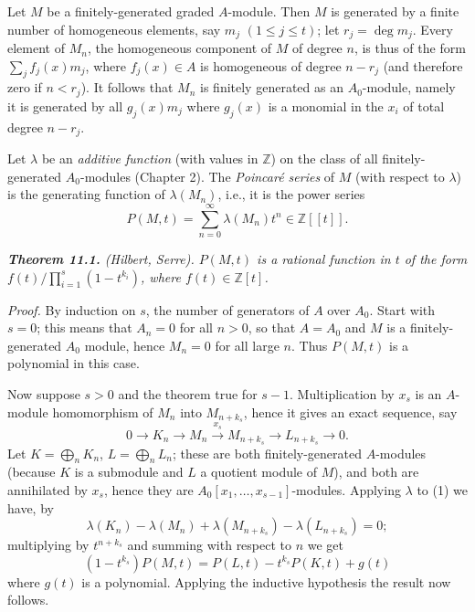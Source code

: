 Let $M$ be a finitely-generated graded $A$-module.  Then $M$ is generated by a
finite number of homogeneous elements, say $m_j$ $(1\leq j\leq t)$; let $r_j=\deg m_j$.
Every element of $M_n$, the homogeneous component of $M$ of degree $n$, is thus of
the form $\sum_j f_j(x)m_j$, where $f_j(x)\in A$ is homogeneous of degree $n-r_j$ (and
therefore zero if $n<r_j$).  It follows that $M_n$ is finitely generated as an $A_0$-module, namely it is generated by all $g_j(x)m_j$ where $g_j(x)$ is a monomial in the
$x_i$ of total degree $n-r_j$.

Let $\lambda$ be an \emph{additive function} (with values in $\mathbb Z$) on the class of all finitely-generated $A_0$-modules (Chapter 2).  The \emph{Poincar\'e series} of $M$ (with respect to $\lambda$)
is the generating function of $\lambda(M_n)$, i.e., it is the power series
\[
P(M,t)=\sum_{n=0}^\infty\lambda(M_n)t^n\in\mathbb Z[[t]].
\]

\medskip
\noindent\textit{\textbf{Theorem 11.1.} (Hilbert, Serre). $P(M,t)$ is a rational function in $t$ of the form
$f(t)/\prod_{i=1}^s(1-t^{k_i})$, where $f(t)\in\mathbb Z[t]$.}

\noindent\emph{Proof.}  By induction on $s$, the number of generators of $A$ over $A_0$.  Start with
$s=0$; this means that $A_n=0$ for all $n>0$, so that $A=A_0$ and $M$ is a finitely-generated $A_0$ module, hence $M_n=0$ for all large $n$.  Thus $P(M,t)$ is a polynomial
in this case.

Now suppose $s>0$ and the theorem true for $s-1$.  Multiplication by $x_s$
is an $A$-module homomorphism of $M_n$ into $M_{n+k_s}$, hence it gives an exact
sequence, say
\begin{equation}
0\longrightarrow K_n\longrightarrow M_n\xrightarrow{x_s}M_{n+k_s}\longrightarrow L_{n+k_s}\longrightarrow0.
\tag{1}
\end{equation}
Let $K=\bigoplus_nK_n$, $L=\bigoplus_nL_n$; these are both finitely-generated $A$-modules
(because $K$ is a submodule and $L$ a quotient module of $M$), and both are annihilated by $x_s$, hence they are $A_0[x_1,\ldots,x_{s-1}]$-modules.  Applying $\lambda$ to (1) we
have, by 
\[
\lambda(K_n)-\lambda(M_n)+\lambda(M_{n+k_s})-\lambda(L_{n+k_s})=0;
\]
multiplying by $t^{n+k_s}$ and summing with respect to $n$ we get
\begin{equation}
(1-t^{k_s})P(M,t)=P(L,t)-t^{k_s}P(K,t)+g(t)
\tag{2}
\end{equation}
where $g(t)$ is a polynomial.  Applying the inductive hypothesis the result now
follows.\proofbox

